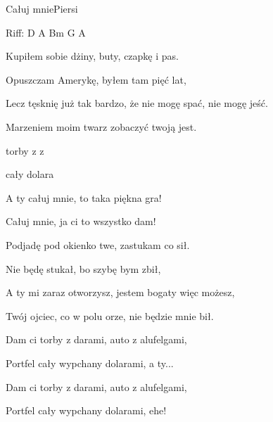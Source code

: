 \begin{song}{Całuj mnie}{}{}{Piersi}{}{}

Riff: D A Bm G A

  \begin{SBVerse}
    Kupiłem sobie dżiny, buty, czapkę i pas.

    Opuszczam Amerykę, byłem tam pięć lat,

    Lecz tęsknię już tak bardzo, że nie mogę spać, nie mogę jeść.

    Marzeniem moim twarz zobaczyć twoją jest.

     torby z   z 

     cały  dolara 
  \end{SBVerse}

  \begin{SBChorus}
    A ty całuj mnie, to taka piękna gra!

    Całuj mnie, ja ci to wszystko dam!
  \end{SBChorus}
  \begin{SBVerse}
    Podjadę pod okienko twe, zastukam co sił.

    Nie będę stukał, bo szybę bym zbił,

    A ty mi zaraz otworzysz, jestem bogaty więc możesz,

    Twój ojciec, co w polu orze, nie będzie mnie bił.

    Dam ci torby z darami, auto z alufelgami,

    Portfel cały wypchany dolarami, a ty...
  \end{SBVerse}
  \begin{SBChorus}
    Dam ci torby z darami, auto z alufelgami,

    Portfel cały wypchany dolarami, ehe!
  \end{SBChorus}
\end{song}
